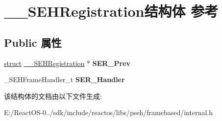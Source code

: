 \hypertarget{struct_____s_e_h_registration}{}\section{\+\_\+\+\_\+\+S\+E\+H\+Registration结构体 参考}
\label{struct_____s_e_h_registration}
\subsection*{Public 属性}
\begin{DoxyCompactItemize}
\item 
\mbox{\label{struct_____s_e_h_registration_afefa3e936b856a8b613ba5ac0996dff1}} 
\hyperlink{interfacestruct}{struct} \hyperlink{struct_____s_e_h_registration}{\+\_\+\+\_\+\+S\+E\+H\+Registration} $\ast$ {\bfseries S\+E\+R\+\_\+\+Prev}
\item 
\mbox{\label{struct_____s_e_h_registration_ac989fa5fec41a490021326ce658e042e}} 
\+\_\+\+S\+E\+H\+Frame\+Handler\+\_\+t {\bfseries S\+E\+R\+\_\+\+Handler}
\end{DoxyCompactItemize}


该结构体的文档由以下文件生成\+:\begin{DoxyCompactItemize}
\item 
E\+:/\+React\+O\+S-\/0../sdk/include/reactos/libs/pseh/framebased/internal.\+h\end{DoxyCompactItemize}
